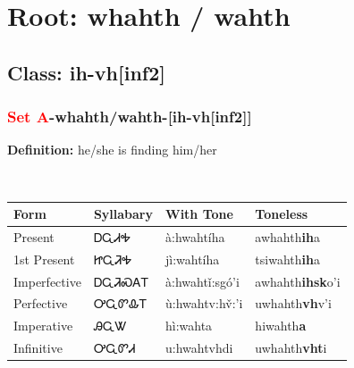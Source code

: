 \needspace{4in}
\section*{Root: whahth / wahth}
\nopagebreak
{}
\needspace{3in}
\subsection*{Class: ih-vh[inf2]}
\nopagebreak
\needspace{2in}
\subsubsection*{\textcolor{Red}{Set A}{-}\textbf{whahth/wahth}{-}[ih-vh[inf2]]}
\nopagebreak
\textbf{Definition: } he/she is finding him/her
\\[0.5em]
\begin{tabularx}{\textwidth}{l X X X}%
\toprule%
\textbf{Form}&\textbf{Syllabary}&\textbf{With Tone}&\textbf{Toneless}\\%
\midrule%
Present&ᎠᏩᏗᎭ&à:hwahtíha&awhahth\textbf{ih}a\\%
1st Present&ᏥᏩᏘᎭ&jì:wahtíha&tsiwahth\textbf{ih}a\\%
Imperfective&ᎠᏩᏘᏍᎪᎢ&à:hwahtǐ:sgó’i&awhahth\textbf{ihsk}o'i\\%
Perfective&ᎤᏩᏛᎲᎢ&ù:hwahtv:hv̌:’i&uwhahth\textbf{vh}v'i\\%
Imperative&ᎯᏩᏔ&hì:wahta&hiwahth\textbf{a}\\%
Infinitive&ᎤᏩᏛᏗ&u:hwahtvhdi&uwhahth\textbf{vht}i\\%
\bottomrule%
\end{tabularx}
\\[1em]